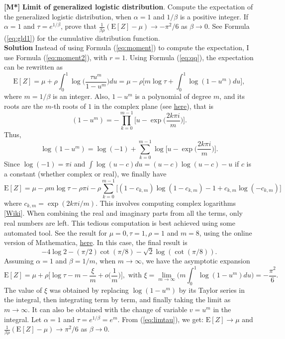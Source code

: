 \documentclass[10pt]{article}
\begin{document}
\begin{Exercise} \label{exercise6} {\bf [M*]} 
{\bf Limit of generalized logistic distribution}. Compute the expectation of the \textcolor{index}{generalized logistic distribution}, when $\alpha=1$ and $1/\beta$ is a positive integer. If $\alpha=1$ and $\tau=e^{1/\beta}$, prove that $\frac{1}{\beta\rho}(\mbox{E}[Z]-\mu)\rightarrow-\pi^2/6$ as  $\beta\rightarrow 0$. See Formula (\ref{eq:gld1}) for the cumulative distribution function. \vspace{1ex} \\
{\bf Solution} Instead of using Formula (\ref{eq:moment}) to compute the expectation, I use Formula (\ref{eq:moment2}), with $r=1$. Using Formula (\ref{eq:qq}), the expectation can be rewritten as
$$\mbox{E}[Z]=\mu+\rho\int_{0}^1 \log \Big(\frac{\tau u^{m}}{1-u^{m}}\Big)du = \mu - \rho\Big[m\log \tau + \int_0^1 \log(1-u^m)du\Big],$$
where $m=1/\beta$ is an integer. Also, $1-u^m$ is a polynomial of degree $m$, and its roots are the $m$-th roots of $1$ in the complex plane (see \href{https://en.wikipedia.org/wiki/Root_of_unity}{here}), that is
$$(1-u^m)=-\prod_{k=0}^{m-1}\Big[u-\exp\Big(\frac{2 k\pi i}{m}\Big)\Big].$$
Thus,
$$\log(1-u^m)=\log(-1)+\sum_{k=0}^{m-1}\log \Big[u-\exp\Big(\frac{2 k\pi i}{m}\Big)\Big].$$
Since $\log(-1)=\pi i$ and $\int \log (u - c) du = (u - c)\log(u - c) - u$ if $c$ is a constant (whether complex or real), we finally have
$$\mbox{E}[Z]= \mu - \rho m\log \tau -\rho\pi i - \rho\sum_{k=0}^{m-1} \Big[(1-c_{k,m})\log(1-c_{k,m})-1+c_{k,m}\log(-c_{k,m})\Big] $$
where $c_{k,m} =\exp(2 k\pi i/m)$. This involves computing complex logarithms  [\href{https://en.wikipedia.org/wiki/Complex_logarithm}{Wiki}]. When combining the real and imaginary parts from all the terms, only real numbers are left. This tedious computation is best achieved using some automated tool. See the result for $\mu=0,\tau=1,\rho=1$ and $m=8$, 
using the online version of Mathematica, \href{https://bit.ly/3oZzA49}{here}. In this case, the final result is 
$$  -4\log 2 - (\pi/2) \cot(\pi/8) - \sqrt{2} \log(\cot(\pi/8)).$$
Assuming $\alpha=1$ and $\beta=1/m$, when $m\rightarrow\infty$, we have the asymptotic expansion
\begin{equation}
\mbox{E}[Z]= \mu+\rho\Big[\log\tau -m - \frac{\xi}{m}  + o\Big(\frac{1}{m}\Big)\Big], \mbox{ with } \xi = \lim_{m\rightarrow \infty} \Big(m\int_0^1 \log(1-u^m)du\Big)=-\frac{\pi^2}{6}. \label{eq:limtau}
\end{equation}
The value of $\xi$ was obtained by replacing $\log(1-u^m)$ by its Taylor series in the integral, then integrating term by term, and finally taking the limit as $m\rightarrow \infty$. It can also be obtained with the change of variable $v=u^m$ in the integral.  Let $\alpha=1$ and $\tau=e^{1/\beta}=e^m$. From (\ref{eq:limtau}), we get: $\mbox{E}[Z]\rightarrow \mu$ and $\frac{1}{\beta\rho}(\mbox{E}[Z]-\mu)\rightarrow \pi^2/6$ as  $\beta\rightarrow 0$. 
\end{Exercise}
\end{document}
